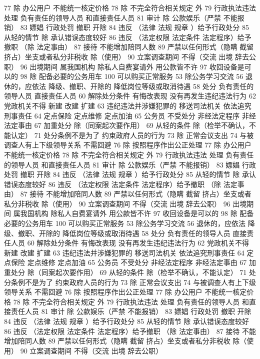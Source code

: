 \documentclass[11pt]{ctexart}
\begin{document}
77 除 办公用户
不能统一核定价格
78 除 不完全符合相关规定 外
79 行政执法违法 处理
负有责任的领导人员
和直接责任人员
81 审计
除 公款娱乐（严禁 不能报销）
83 嫖娼 行政处罚
撤职 开除
84 违反 （法律 法规 规章 ）给予行政处分
85 从轻的情节
除 承认错误态度较好
86 违反 （法定权限 法定条件 法定程序）给予撤职
（除 法定事由）
87 接待 不能增加陪同人数
89 严禁以任何形式（隐瞒 截留 挤占）坐支或者私分非税收
除（使用）
90 立案调查期间 不得（交流 出境 辞去公职）
96 出境期间 属我国机构 除私人自费宴请外 用公款皆不许
97 收回设备是可以的
98 除 配备必要的公务用车
100 可以购买正常服务
53 除公务学习交流
56 退休的，应依法
降级、撤职、开除的 降低岗位等级或取消待遇
58 处分
负有责任的领导人员
直接责任人员
60 解除处分条件
有悔改表现
没有再发生违纪违法行为
62 党政机关不得
新建 改建 扩建
63 违纪违法并涉嫌犯罪的
移送司法机关
依法追究刑事责任
64 定点保险 定点维修 定点加油
65 公务员 不受处分
非经法定程序
非经法定事由
67 加重处分
除（同案起次要作用）
69 从轻的条件
除（检举不确认，不能认定）
71 处分条例不是为了
约束政府人员的行为
73 除 正常会议支出
74 与被调查人有上下级领导关系 不需回避
76 除 按照程序作出公正处理
77 除 办公用户
不能统一核定价格
78 除 不完全符合相关规定 外
79 行政执法违法 处理
负有责任的领导人员
和直接责任人员
81 审计
除 公款娱乐（严禁 不能报销）
83 嫖娼 行政处罚
撤职 开除
84 违反 （法律 法规 规章 ）给予行政处分
85 从轻的情节
除 承认错误态度较好
86 违反 （法定权限 法定条件 法定程序）给予撤职
（除 法定事由）
87 接待 不能增加陪同人数
89 严禁以任何形式（隐瞒 截留 挤占）坐支或者私分非税收
除（使用）
90 立案调查期间 不得（交流 出境 辞去公职）
96 出境期间 属我国机构 除私人自费宴请外 用公款皆不许
97 收回设备是可以的
98 除 配备必要的公务用车
100 可以购买正常服务
53 除公务学习交流
56 退休的，应依法
降级、撤职、开除的 降低岗位等级或取消待遇
58 处分
负有责任的领导人员
直接责任人员
60 解除处分条件
有悔改表现
没有再发生违纪违法行为
62 党政机关不得
新建 改建 扩建
63 违纪违法并涉嫌犯罪的
移送司法机关
依法追究刑事责任
64 定点保险 定点维修 定点加油
65 公务员 不受处分
非经法定程序
非经法定事由
67 加重处分
除（同案起次要作用）
69 从轻的条件
除（检举不确认，不能认定）
71 处分条例不是为了
约束政府人员的行为
73 除 正常会议支出
74 与被调查人有上下级领导关系 不需回避
76 除 按照程序作出公正处理
77 除 办公用户
不能统一核定价格
78 除 不完全符合相关规定 外
79 行政执法违法 处理
负有责任的领导人员
和直接责任人员
81 审计
除 公款娱乐（严禁 不能报销）
83 嫖娼 行政处罚
撤职 开除
84 违反 （法律 法规 规章 ）给予行政处分
85 从轻的情节
除 承认错误态度较好
86 违反 （法定权限 法定条件 法定程序）给予撤职
（除 法定事由）
87 接待 不能增加陪同人数
89 严禁以任何形式（隐瞒 截留 挤占）坐支或者私分非税收
除（使用）
90 立案调查期间 不得（交流 出境 辞去公职）
\end{document}
